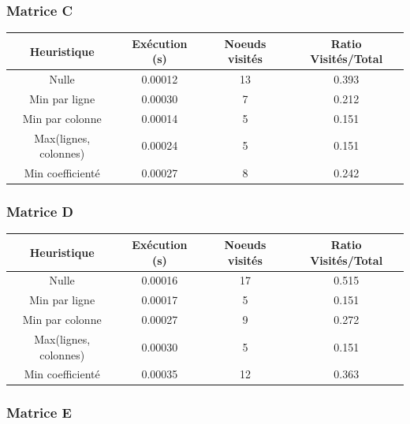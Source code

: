 \documentclass[11pt]{article} %
\begin{document}
\subsubsection{Matrice C}

\begin{center}
    \begin{tabular}{|c|c|c|c|}
        \hline
        \textbf{Heuristique} & \textbf{Exécution (s)} & \textbf{Noeuds visités} & \textbf{Ratio Visités/Total} \\ \hline
        Nulle &   0.00012   &  13   &  0.393 \\ \hline
        Min par ligne &   0.00030   &  7   &  0.212 \\ \hline
        Min par colonne &   0.00014   &  5   &  0.151 \\ \hline
        Max(lignes, colonnes) &   0.00024   &  5   &  0.151 \\ \hline
        Min coefficienté &   0.00027   &  8   &  0.242 \\ \hline
    \end{tabular}
\end{center}

\subsubsection{Matrice D}

\begin{center}
    \begin{tabular}{|c|c|c|c|}
        \hline
        \textbf{Heuristique} & \textbf{Exécution (s)} & \textbf{Noeuds visités} & \textbf{Ratio Visités/Total} \\ \hline
        Nulle &   0.00016   &  17   &  0.515 \\ \hline
        Min par ligne &   0.00017   &  5   &  0.151 \\ \hline
        Min par colonne &   0.00027   &  9   &  0.272 \\ \hline
        Max(lignes, colonnes) &   0.00030   &  5   &  0.151 \\ \hline
        Min coefficienté &   0.00035   &  12   &  0.363 \\ \hline
    \end{tabular}
\end{center}

\subsubsection{Matrice E}
\end{document}

